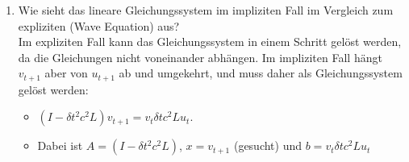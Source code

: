 \documentclass[10pt,a4paper,titlepage]{article}
\begin{document}
\begin{enumerate}[resume=b]
	\item Wie sieht das lineare Gleichungssystem im impliziten Fall im Vergleich zum expliziten (Wave Equation) aus? \\
		Im expliziten Fall kann das Gleichungssystem in einem Schritt gelöst werden, da die Gleichungen nicht voneinander abhängen. Im impliziten Fall hängt $v_{t+1}$ aber von $u_{t+1}$ ab und umgekehrt, und muss daher als Gleichungssystem gelöst werden: \\
	\begin{itemize}
		\item $\left( I - \delta t^2 c^2 L \right)v_{t+1} = v_t \delta t c^2Lu_t$.
		\item Dabei ist $A = \left( I - \delta t^2 c^2 L \right)$, $ x = v_{t+1}$ (gesucht) und
		$b = v_t \delta t c^2Lu_t$
	\end{itemize}
\end{enumerate}
\end{document}
